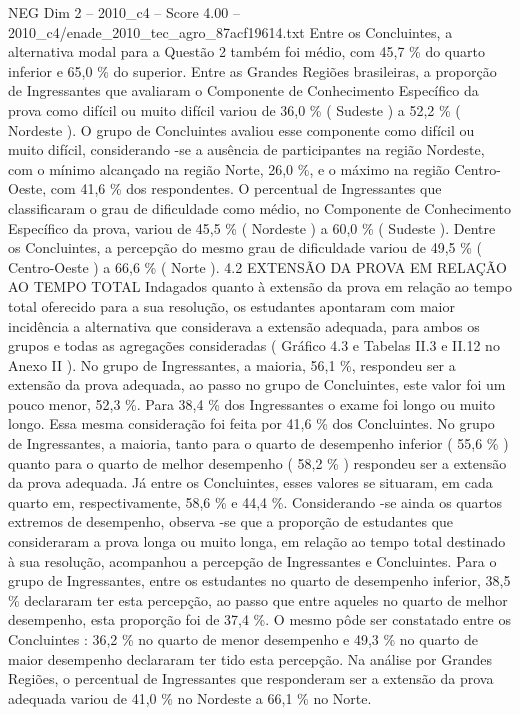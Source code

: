 \begin{textsample}{NEG Dim 2 – 2010\_c4 – Score 4.00 – 2010\_c4/enade\_2010\_tec\_agro\_87acf19614.txt}
Entre os Concluintes, a alternativa modal para a Questão 2 também foi médio, com 45,7 \% do quarto inferior e 65,0 \% do superior.
Entre as Grandes Regiões brasileiras, a proporção de Ingressantes que avaliaram o Componente de Conhecimento Específico da prova como difícil ou muito difícil variou de 36,0 \% ( Sudeste ) a 52,2 \% ( Nordeste ).
O grupo de Concluintes avaliou esse componente como difícil ou muito difícil, considerando -se a ausência de participantes na região Nordeste, com o mínimo alcançado na região Norte, 26,0 \%, e o máximo na região Centro-Oeste, com 41,6 \% dos respondentes.
O percentual de Ingressantes que classificaram o grau de dificuldade como médio, no Componente de Conhecimento Específico da prova, variou de 45,5 \% ( Nordeste ) a 60,0 \% ( Sudeste ).
Dentre os Concluintes, a percepção do mesmo grau de dificuldade variou de 49,5 \% ( Centro-Oeste ) a 66,6 \% ( Norte ). 4.2 EXTENSÃO DA PROVA EM RELAÇÃO AO TEMPO TOTAL Indagados quanto à extensão da prova em relação ao tempo total oferecido para a sua resolução, os estudantes apontaram com maior incidência a alternativa que considerava a extensão adequada, para ambos os grupos e todas as agregações consideradas ( Gráfico 4.3 e Tabelas II.3 e II.12 no Anexo II ).
No grupo de Ingressantes, a maioria, 56,1 \%, respondeu ser a extensão da prova adequada, ao passo no grupo de Concluintes, este valor foi um pouco menor, 52,3 \%.
Para 38,4 \% dos Ingressantes o exame foi longo ou muito longo.
Essa mesma consideração foi feita por 41,6 \% dos Concluintes.
No grupo de Ingressantes, a maioria, tanto para o quarto de desempenho inferior ( 55,6 \% ) quanto para o quarto de melhor desempenho ( 58,2 \% ) respondeu ser a extensão da prova adequada.
Já entre os Concluintes, esses valores se situaram, em cada quarto em, respectivamente, 58,6 \% e 44,4 \%.
Considerando -se ainda os quartos extremos de desempenho, observa -se que a proporção de estudantes que consideraram a prova longa ou muito longa, em relação ao tempo total destinado à sua resolução, acompanhou a percepção de Ingressantes e Concluintes.
Para o grupo de Ingressantes, entre os estudantes no quarto de desempenho inferior, 38,5 \% declararam ter esta percepção, ao passo que entre aqueles no quarto de melhor desempenho, esta proporção foi de 37,4 \%.
O mesmo pôde ser constatado entre os Concluintes : 36,2 \% no quarto de menor desempenho e 49,3 \% no quarto de maior desempenho declararam ter tido esta percepção.
Na análise por Grandes Regiões, o percentual de Ingressantes que responderam ser a extensão da prova adequada variou de 41,0 \% no Nordeste a 66,1 \% no Norte.

\end{textsample}
